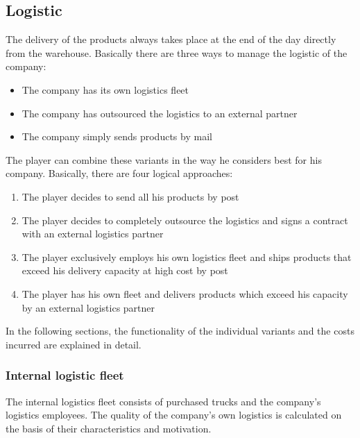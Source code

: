 \subsection{Logistic}
The delivery of the products always takes place at the end of the day directly from the warehouse. Basically there are three ways to manage the logistic of the company: 
\begin{itemize}
    \item The company has its own logistics fleet
    \item The company has outsourced the logistics to an external partner
    \item The company simply sends products by mail
\end{itemize}

The player can combine these variants in the way he considers best for his company. Basically, there are four logical approaches:
\begin{enumerate}
    \item The player decides to send all his products by post 
    \item The player decides to completely outsource the logistics and signs a contract with an external logistics partner
    \item The player exclusively employs his own logistics fleet and ships products that exceed his delivery capacity at high cost by post
    \item The player has his own fleet and delivers products which exceed his capacity by an external logistics partner
\end{enumerate}
	
In the following sections, the functionality of the individual variants and the costs incurred are explained in detail.


\subsubsection{Internal logistic fleet}
The internal logistics fleet consists of purchased trucks and the company's logistics employees. The quality of the company's own logistics is calculated on the basis of their characteristics and motivation.


